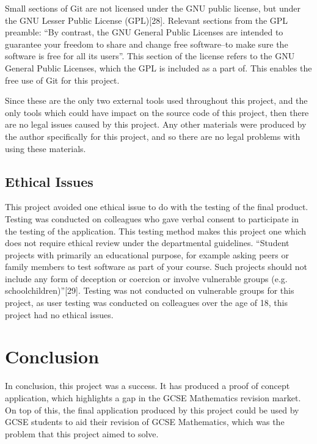 \documentclass{article}
\begin{document}
Small sections of Git are not licensed under the GNU public license, but under the GNU Lesser Public License (GPL)[28]. Relevant sections from the GPL preamble: ``By contrast, the GNU General Public Licenses are intended to guarantee your freedom to share and change free software--to make sure the software is free for all its users''. This section of the license refers to the GNU General Public Licenses, which the GPL is included as a part of. This enables the free use of Git for this project. \par

Since these are the only two external tools used throughout this project, and the only tools which could have impact on the source code of this project, then there are no legal issues caused by this project. Any other materials were produced by the author specifically for this project, and so there are no legal problems with using these materials. \par

\subsection{Ethical Issues}

This project avoided one ethical issue to do with the testing of the final product. Testing was conducted on colleagues who gave verbal consent to participate in the testing of the application. This testing method makes this project one which does not require ethical review under the departmental guidelines. ``Student projects with primarily an educational purpose, for example asking peers or family members to test software as part of your course. Such projects should not include any form of deception or coercion or involve vulnerable groups (e.g. schoolchildren)''[29]. Testing was not conducted on vulnerable groups for this project, as user testing was conducted on colleagues over the age of 18, this project had no ethical issues. 

\section{Conclusion}
\label{section:conclusion}

In conclusion, this project was a success. It has produced a proof of concept application, which highlights a gap in the GCSE Mathematics revision market. On top of this, the final application produced by this project could be used by GCSE students to aid their revision of GCSE Mathematics, which was the problem that this project aimed to solve. \par
\end{document}
